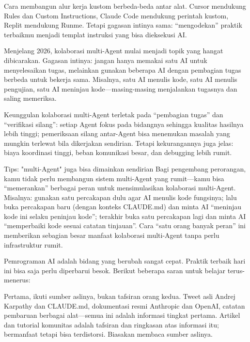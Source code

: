 Cara membangun alur kerja kustom berbeda-beda antar alat. Cursor mendukung Rules dan Custom Instructions, Claude Code mendukung perintah kustom, Replit mendukung Runme. Tetapi gagasan intinya sama: “mengodekan” praktik terbaikmu menjadi templat instruksi yang bisa dieksekusi AI.


Menjelang 2026, kolaborasi multi-Agent mulai menjadi topik yang hangat dibicarakan. Gagasan intinya: jangan hanya memakai satu AI untuk menyelesaikan tugas, melainkan gunakan beberapa AI dengan pembagian tugas berbeda untuk bekerja sama. Misalnya, satu AI menulis kode, satu AI menulis pengujian, satu AI meninjau kode—masing-masing menjalankan tugasnya dan saling memeriksa.

Keunggulan kolaborasi multi-Agent terletak pada “pembagian tugas” dan “verifikasi silang”: setiap Agent fokus pada bidangnya sehingga kualitas hasilnya lebih tinggi; pemeriksaan silang antar-Agent bisa menemukan masalah yang mungkin terlewat bila dikerjakan sendirian. Tetapi kekurangannya juga jelas: biaya koordinasi tinggi, beban komunikasi besar, dan debugging lebih rumit.

\begin{tcbinfo}{Tips: "multi-Agent" juga bisa dimainkan sendirian}
Bagi pengembang perorangan, kamu tidak perlu membangun sistem multi-Agent yang rumit—kamu bisa “memerankan” berbagai peran untuk mensimulasikan kolaborasi multi-Agent. Misalnya: gunakan satu percakapan dulu agar AI menulis kode fungsinya; lalu buka percakapan baru (dengan konteks CLAUDE.md) dan minta AI “meninjau kode ini selaku peninjau kode”; terakhir buka satu percakapan lagi dan minta AI “memperbaiki kode sesuai catatan tinjauan”. Cara “satu orang banyak peran” ini memberikan sebagian besar manfaat kolaborasi multi-Agent tanpa perlu infrastruktur rumit.

\end{tcbinfo}


Pemrograman AI adalah bidang yang berubah sangat cepat. Praktik terbaik hari ini bisa saja perlu diperbarui besok. Berikut beberapa saran untuk belajar terus-menerus:

Pertama, ikuti sumber aslinya, bukan tafsiran orang kedua. Tweet asli Andrej Karpathy dan CLAUDE.md, dokumentasi resmi Anthropic dan OpenAI, catatan pembaruan berbagai alat—semua ini adalah informasi tingkat pertama. Artikel dan tutorial komunitas adalah tafsiran dan ringkasan atas informasi itu; bermanfaat tetapi bisa terdistorsi. Biasakan membaca sumber aslinya.

